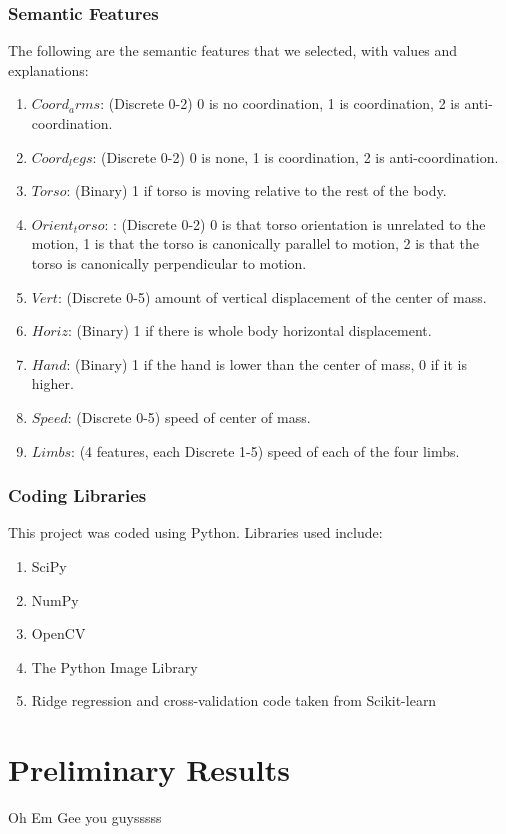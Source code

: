\documentclass{article}
\begin{document}
\subsubsection{Semantic Features}
\label{sf}
The following are the semantic features that we selected, with values and explanations:
\begin{enumerate}
\item
$Coord_arms$: (Discrete 0-2) 0 is no coordination, 1 is coordination, 2 is anti-coordination.
\item
$Coord_legs$: (Discrete 0-2) 0 is none, 1 is coordination, 2 is anti-coordination.
\item
$Torso$: (Binary) 1 if torso is moving relative to the rest of the body.
\item
$Orient_torso$: : (Discrete 0-2) 0 is that torso orientation is unrelated to the motion, 1 is that the torso is canonically parallel to motion, 2 is that the torso is canonically perpendicular to motion.
\item
$Vert$: (Discrete 0-5) amount of vertical displacement of the center of mass.
\item
$Horiz$: (Binary) 1 if there is whole body horizontal displacement.
\item
$Hand$: (Binary) 1 if the hand is lower than the center of mass, 0 if it is higher.
\item
$Speed$: (Discrete 0-5) speed of center of mass.
\item
$Limbs$: (4 features, each Discrete 1-5) speed of each of the four limbs.
\end{enumerate}
\subsubsection{Coding Libraries}
This project was coded using Python. Libraries used include:
\begin{enumerate}
\item
SciPy \cite{scipy}
\item
NumPy \cite{numpy}
\item
OpenCV \cite{opencv}
\item
The Python Image Library \cite{pil}
\item
Ridge regression and cross-validation code taken from Scikit-learn \cite{scikit}
\end{enumerate}
\section{Preliminary Results} %
Oh Em Gee you guysssss
\end{document}
